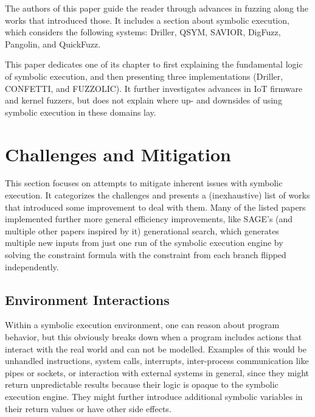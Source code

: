 \documentclass{article}
\begin{document}
\begin{multicols}{2}
  The authors of this paper guide the reader through advances in fuzzing along the works that introduced those. It includes a section about symbolic execution, which considers the following systems: Driller\cite{Driller}, QSYM\cite{QSYM}, SAVIOR\cite{SAVIOR}, DigFuzz\cite{DigFuzz}, Pangolin\cite{Pangolin}, and QuickFuzz\cite{QuickFuzz}.

  This paper dedicates one of its chapter to first explaining the fundamental logic of symbolic execution, and then presenting three implementations (Driller\cite{Driller}, CONFETTI\cite{CONFETTI}, and FUZZOLIC\cite{FUZZOLIC}). It further investigates advances in IoT firmware and kernel fuzzers, but does not explain where up- and downsides of using symbolic execution in these domains lay.

  \section{Challenges and Mitigation}
  \label{Results}
  This section focuses on attempts to mitigate inherent issues with symbolic execution. It categorizes the challenges and presents a (inexhaustive) list of works that introduced some improvement to deal with them. Many of the listed papers implemented further more general efficiency improvements, like SAGE's\cite{SAGE} (and multiple other papers inspired by it) generational search, which generates multiple new inputs from just one run of the symbolic execution engine by solving the constraint formula with the constraint from each branch flipped independently.

  \subsection{Environment Interactions}
  Within a symbolic execution environment, one can reason about program behavior, but this obviously breaks down when a program includes actions that interact with the real world and can not be modelled. Examples of this would be unhandled instructions, system calls, interrupts, inter-process communication like pipes or sockets, or interaction with external systems in general, since they might return unpredictable results because their logic is opaque to the symbolic execution engine.\cite{Demystifying} They might further introduce additional symbolic variables in their return values or have other side effects.


\end{multicols}
\end{document}
